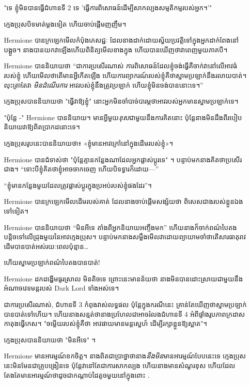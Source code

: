 "ទេ ខ្ញុំមិនបានធ្វើជំហានទី 2 ទេ 'ធ្វើការពិសោធន៍ដើម្បីសាកល្បងសម្មតិកម្មរបស់អ្នក។'"

ក្មេងប្រុសបិទមាត់ម្តងទៀត ហើយចាប់ផ្តើមញញឹម។

Hermione បានក្រឡេកមើលកំប៉ុងភេសជ្ជៈ ដែលនាងដាក់ដោយស្វ័យប្រវត្តិទៅក្នុងអ្នកដាក់ពែងនៅបង្អួច។ នាង​បាន​យក​វា​ឡើង​ហើយ​ពិនិត្យ​មើល​ខាង​ក្នុង ហើយ​បាន​ឃើញ​ថា​វា​ពេញ​មួយ​ភាគ​បី។

Hermione បាននិយាយថា “ជាការប្រសើរណាស់ ការពិសោធន៍ដែលខ្ញុំចង់ធ្វើគឺចាក់វានៅលើអាវធំរបស់ខ្ញុំ ហើយមើលថាតើមានអ្វីកើតឡើង ហើយការព្យាករណ៍របស់ខ្ញុំគឺថាស្នាមប្រឡាក់នឹងរលាយបាត់។ លុះត្រាតែវា \emph{មិនដំណើរការ} អាវរបស់ខ្ញុំនឹងត្រូវប្រឡាក់ ហើយខ្ញុំមិនចង់បាននោះទេ។”

ក្មេងប្រុសបាននិយាយថា "ធ្វើវាឱ្យខ្ញុំ" នោះអ្នកមិនចាំបាច់បារម្ភថាអាវរបស់អ្នកមានស្នាមប្រឡាក់ទេ។

"ប៉ុន្តែ -" Hermione បាននិយាយ។ មានអ្វីមួយ\emph{ខុស}ជាមួយនឹងការគិតនោះ ប៉ុន្តែនាងមិនដឹងពីរបៀបនិយាយវាឱ្យពិតប្រាកដនោះទេ។

ក្មេង​ប្រុស​រូប​នេះ​បាន​និយាយ​ថា៖ «ខ្ញុំ​មាន​អាវ​ក្រៅ​នៅ​ក្នុង​ដើម​របស់​ខ្ញុំ»។

Hermione បានជំទាស់ថា "ប៉ុន្តែគ្មានកន្លែងណាដែលអ្នកផ្លាស់ប្តូរទេ" ។ បន្ទាប់មកនាងគិតថាប្រសើរជាង។ “ទោះបីខ្ញុំគិតថាខ្ញុំអាចចាកចេញ ហើយបិទទ្វារក៏ដោយ—”

“ខ្ញុំ​មាន​កន្លែង​មួយ​ដែល​ត្រូវ​ផ្លាស់​ប្តូរ​ក្នុង​ប្រអប់​របស់​ខ្ញុំ​ផង​ដែរ”។

Hermione បានក្រឡេកមើលដើមរបស់គាត់ ដែលនាងចាប់ផ្តើមសង្ស័យថា ពិសេសជាងរបស់ខ្លួនឯងទៅទៀត។

Hermione បាននិយាយថា “មិនអីទេ តាំងពីអ្នកនិយាយអញ្ចឹងមក” ហើយនាងក៏ចាក់ពណ៌បៃតងបន្តិចទៅលើជ្រុងមួយនៃអាវក្មេងប្រុស។ បន្ទាប់មកនាងសម្លឹងមើលវាដោយព្យាយាមចាំថាតើសារធាតុរាវដើមបានបាត់អស់រយៈពេលប៉ុន្មាន…

ហើយស្នាមប្រឡាក់ពណ៌បៃតងបានបាត់!

Hermione ដក​ដង្ហើម​ធូរ​ស្រាល មិន​តិច​ទេ ព្រោះ​នេះ​មាន​ន័យ​ថា នាង​មិន​បាន​ដោះស្រាយ​ជាមួយ​នឹង​អំណាច​វេទមន្ត​របស់ Dark Lord ទាំងអស់​ទេ។

ជាការប្រសើរណាស់, ជំហានទី 3 កំពុងវាស់លទ្ធផល ប៉ុន្តែក្នុងករណីនេះ គ្រាន់តែឃើញថាស្នាមប្រឡាក់បានបាត់ទៅហើយ។ ហើយនាងសន្មត់ថានាងប្រហែលជាអាចរំលងជំហានទី 4 អំពីផ្ទាំងរូបភាពក្រដាសកាតុងធ្វើកេស។ "ចម្លើយរបស់ខ្ញុំគឺថា អាវផាយមានមន្តស្នេហ៍ ដើម្បីរក្សាខ្លួនឱ្យស្អាត"។

ក្មេងប្រុសបាននិយាយថា "មិនអីទេ" ។

Hermione មានអារម្មណ៍ខកចិត្ត។ នាងពិតជាប្រាថ្នាថានាង\emph{នឹងមិន}មានអារម្មណ៍បែបនេះទេ ក្មេងប្រុសនេះមិនមែនជាគ្រូបង្រៀនទេ ប៉ុន្តែវានៅតែជាការសាកល្បង ហើយនាងមានសំណួរខុស ហើយដែលតែងតែមានអារម្មណ៍ថាដូចជាកណ្តាប់ដៃតូចមួយនៅក្នុងពោះ .

